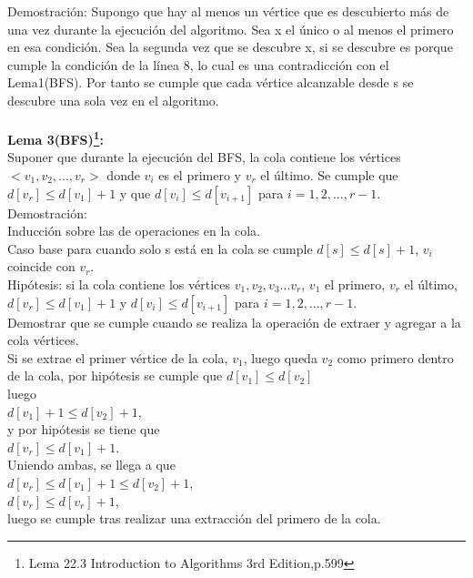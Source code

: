 \documentclass[12pt]{article}
\begin{document}
Demostraci\'on: Supongo que hay al menos un v\'ertice que es descubierto m\'as de una vez durante la ejecuci\'on del algoritmo. Sea x el \'unico
o al menos el primero en esa condici\'on. Sea la segunda vez que se descubre x, si se descubre es porque cumple la  condici\'on 
de la l\'inea 8, lo cual es una contradicci\'on con el Lema1(BFS). Por tanto se cumple que cada v\'ertice alcanzable desde  s se descubre una sola vez en 
el algoritmo.\\
\\
 
\textbf{Lema 3(BFS)\footnote{Lema 22.3 Introduction to Algorithms 3rd Edition,p.599}:}\\
Suponer que durante la ejecuci\'on del BFS, la cola contiene los v\'ertices $<v_1, v_2, ..., v_r>$ donde $v_i$ es el primero y $v_r$ el \'ultimo. 
Se cumple que $d[v_r] \leq d[v_1] + 1$ y  que $d[v_i] \leq d[v_{i+1}]$ para $i = 1,2, ...,r-1$.\\

Demostraci\'on:\\
 Inducci\'on sobre las de operaciones en la cola.\\ 
Caso base para cuando solo s est\'a en la cola se cumple $d[s] \leq d[s]+1$, $v_i$ coincide con $v_r$.\\
Hip\'otesis: si la cola contiene los v\'ertices $v_1, v_2, v_3... v_r$, $v_1$ el primero, $v_r$ el \'ultimo,
 $d[v_r] \leq d[v_1] + 1$ y  $d[v_i] \leq d[v_{i + 1}]$ para $i= 1,2,...,r-1$.\\

Demostrar que se cumple cuando se realiza la operaci\'on de extraer y agregar a la cola v\'ertices.\\

Si se extrae el primer v\'ertice de la cola, $v_1$, luego queda $v_2$ como primero dentro de la cola, por hip\'otesis se cumple que $d[v_1] \leq d[v_2]$\\
luego\\ 
$d[v_1] + 1 \leq d[v_2] + 1$,\\ 
y por hip\'otesis se tiene que\\
 $d[v_r] \leq d [v_1]+1$.\\
 Uniendo ambas, se llega a que\\
  $d[v_r] \leq d[v_1] + 1 \leq d[v_2] +1$,\\
$d[v_r] \leq d[v_r] + 1$,\\
 luego se cumple tras realizar una extracci\'on del primero de la cola.\\
\end{document}
